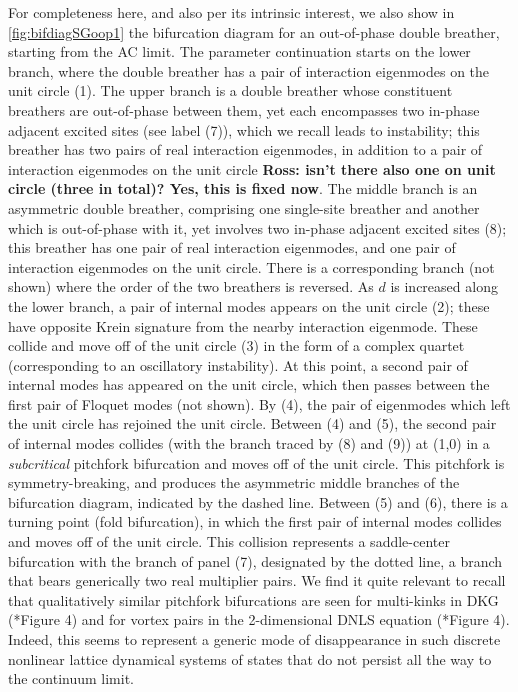 \documentclass[12pt,reqno]{amsart}
\theoremstyle{definition}
\begin{document}
For completeness here, and also per its intrinsic interest,
we also show in 
\cref{fig:bifdiagSGoop1} the bifurcation diagram for an out-of-phase double breather, starting from the AC limit. The parameter continuation starts on the lower branch, where the double breather has a pair of interaction eigenmodes on the unit circle (1). The upper branch is a double breather whose constituent breathers
are out-of-phase between them, yet each encompasses two in-phase adjacent excited sites (see label (7)), which we recall leads
to instability; this breather has two pairs of real interaction eigenmodes, in addition to a pair of interaction eigenmodes on the unit circle {\bf Ross: isn't there also one on unit circle (three
in total)? Yes, this is fixed now}. The middle branch is an asymmetric double breather, comprising one single-site breather and another which is out-of-phase with it, yet involves two in-phase adjacent excited sites (8); this breather has one pair of real interaction eigenmodes, and one pair of interaction eigenmodes on the unit circle. There is a corresponding branch (not shown) where the order of the two breathers is reversed. As $d$ is increased along the lower branch, a pair of internal modes appears on the unit circle (2); these have opposite Krein signature from the nearby interaction eigenmode. These collide and move off of the unit circle (3) in the form of a complex quartet (corresponding
to an oscillatory instability). At this point, a second pair of internal modes has appeared on the unit circle, which then passes between the first pair of Floquet modes (not shown). By (4), the pair of eigenmodes which left the unit circle has rejoined the unit circle. Between (4) and (5), the second pair of internal modes collides (with the branch traced by (8) and (9)) at (1,0) in a {\it subcritical} pitchfork bifurcation and moves off of the unit circle. This pitchfork is symmetry-breaking, and produces the asymmetric middle branches of the bifurcation diagram, indicated by the
dashed line. Between (5) and (6), there is a turning point (fold bifurcation), in which the first pair of internal modes collides and moves off of the unit circle. 
This collision represents a saddle-center bifurcation with the
branch of panel (7), designated by the dotted line, a branch
that bears generically two real multiplier pairs. We find it
quite relevant to recall that
qualitatively similar pitchfork bifurcations are seen for multi-kinks in DKG (\cite{Parker2021}*{Figure 4}) and for vortex pairs in the 2-dimensional DNLS equation (\cite{Bramburger2020}*{Figure 4}).
Indeed, this seems to represent a generic mode of disappearance
in such discrete nonlinear lattice dynamical systems of states
that do not persist all the way to the continuum limit.
\end{document}

